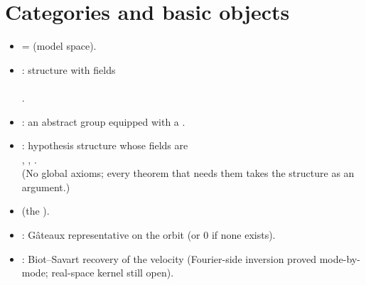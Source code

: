 \documentclass[11pt]{article}
\begin{document}
\section{Categories and basic objects}
\begin{authortext}
\begin{itemize}
\item {} =  (model space).
\item {} : structure with fields\\
  \\
  .
\item {} : an abstract group equipped with a .
\item {} : hypothesis structure whose fields are\\
  , , .\\
  (No global axioms; every theorem that needs them takes the structure as an argument.)
\item {} (the ).
\item {} : Gâteaux representative on the orbit (or 0 if none exists).
\item {} : Biot–Savart recovery of the velocity (Fourier-side
  inversion proved mode-by-mode; real-space kernel still open).
\end{itemize}
\end{authortext}
\end{document}

